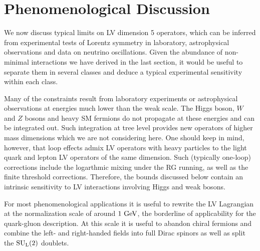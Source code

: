 \documentclass[12pt,preprintnumbers,nofootinbib]{revtex4}
\newcommand{\sul}{{{\rm SU}_{\rm L}(2)}}
\newcommand{\GeV}{{\rm GeV}}
\begin{document}
%
%
\section{Phenomenological Discussion}
\label{phenomenology}

	We now discuss typical limits on LV dimension 5 operators, 
	which can be inferred from experimental tests 
	of Lorentz symmetry in laboratory, astrophysical observations and
	data on neutrino oscillations.
	Given the abundance of non-minimal interactions we have derived in 
	the last section, it would be useful to separate them in several classes 
    and deduce a typical experimental sensitivity within each class.
	
	Many of the constraints result from laboratory experiments
	or astrophysical observations at energies much lower
	than the weak scale. 
	The Higgs boson, $W$ and $Z$  bosons and heavy SM fermions 
    do not propagate 
	at these energies and can be integrated out.  Such integration at tree level 
    provides new operators of 
	higher mass dimensions which we are not considering here.
	One should keep in mind, however, that loop effects
	admix LV operators with heavy particles to the light quark and lepton 
    LV operators of the same dimension. Such (typically one-loop) corrections 
    include the logarthmic mixing under the RG running,
    as well as the finite threshold corrections. 
	Therefore, the bounds discussed below contain an intrinsic sensitivity to LV 
	interactions involving Higgs and weak bosons. 
	

	For most phenomenological applications it 
 is useful to rewrite the LV  Lagrangian at the normalization scale of
	around $ 1~\GeV $, the borderline of applicability for the quark-gluon description.
	At this scale it is useful to abandon chiral fermions and combine the left- and right-handed
fields into
	full Dirac spinors as well as split the
	$ \sul $ doublets. 
	
\end{document}
